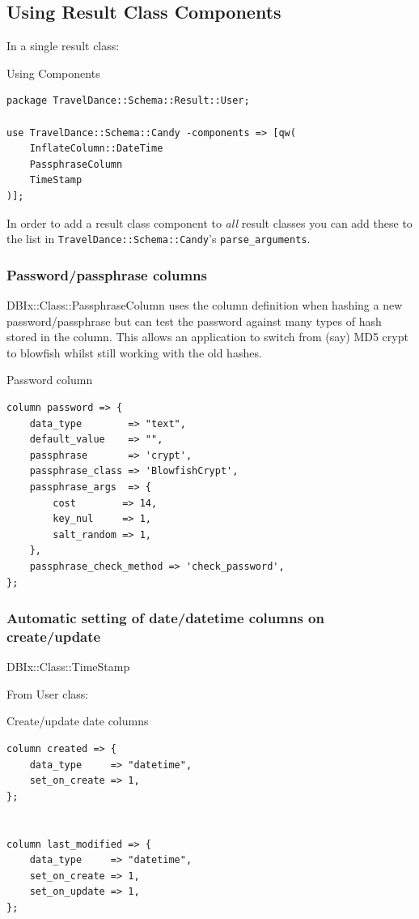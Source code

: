 \subsection{Using Result Class Components}

In a single result class:

\begin{frame}[fragile]{Using Components}
\begin{lstlisting}
package TravelDance::Schema::Result::User;

use TravelDance::Schema::Candy -components => [qw(
    InflateColumn::DateTime 
    PassphraseColumn
    TimeStamp
)];
\end{lstlisting}
\end{frame}

In order to add a result class component to \emph{all} result classes you
can add these to the list 
in \verb|TravelDance::Schema::Candy|'s \verb|parse_arguments|.

\subsubsection{Password/passphrase columns}

DBIx::Class::PassphraseColumn uses the column definition when hashing a new
password/passphrase but can test the password against many types of hash
stored in the column. This allows an application to switch from (say)
MD5 crypt to blowfish whilst still working with the old hashes.

\begin{frame}[fragile]{Password column}
\begin{lstlisting}
column password => {
    data_type        => "text",
    default_value    => "",
    passphrase       => 'crypt',
    passphrase_class => 'BlowfishCrypt',
    passphrase_args  => {
        cost        => 14,
        key_nul     => 1,
        salt_random => 1,
    },
    passphrase_check_method => 'check_password',
};
\end{lstlisting}
\end{frame}

\subsubsection{Automatic setting of date/datetime columns on create/update}
DBIx::Class::TimeStamp

From User class:

\begin{frame}[fragile]{Create/update date columns}
\begin{lstlisting}
column created => {
    data_type     => "datetime",
    set_on_create => 1,
};


column last_modified => {
    data_type     => "datetime",
    set_on_create => 1,
    set_on_update => 1,
};
\end{lstlisting}
\end{frame}

